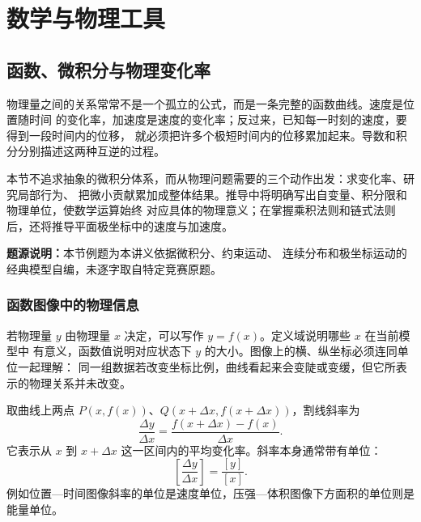 \documentclass[UTF8,zihao=-4,oneside,openany]{ctexbook}
\numberwithin{equation}{section}
\begin{document}
\setcounter{page}{1}
\setcounter{chapter}{0}
\chapter{数学与物理工具}
\setcounter{section}{2}
\fi
\ifdefined\MASTERBOOK\clearpage\fi
\section{函数、微积分与物理变化率}

物理量之间的关系常常不是一个孤立的公式，而是一条完整的函数曲线。速度是位置随时间
的变化率，加速度是速度的变化率；反过来，已知每一时刻的速度，要得到一段时间内的位移，
就必须把许多个极短时间内的位移累加起来。导数和积分分别描述这两种互逆的过程。

本节不追求抽象的微积分体系，而从物理问题需要的三个动作出发：求变化率、研究局部行为、
把微小贡献累加成整体结果。推导中将明确写出自变量、积分限和物理单位，使数学运算始终
对应具体的物理意义；在掌握乘积法则和链式法则后，还将推导平面极坐标中的速度与加速度。

{\small\color{TextGray}\noindent\textbf{题源说明：}本节例题为本讲义依据微积分、约束运动、
连续分布和极坐标运动的经典模型自编，未逐字取自特定竞赛原题。\par}

\subsection{函数图像中的物理信息}

若物理量 $y$ 由物理量 $x$ 决定，可以写作 $y=f(x)$。定义域说明哪些 $x$ 在当前模型中
有意义，函数值说明对应状态下 $y$ 的大小。图像上的横、纵坐标必须连同单位一起理解：
同一组数据若改变坐标比例，曲线看起来会变陡或变缓，但它所表示的物理关系并未改变。

取曲线上两点 $P(x,f(x))$、$Q(x+\Delta x,f(x+\Delta x))$，割线斜率为
\begin{equation}
  \frac{\Delta y}{\Delta x}
  =\frac{f(x+\Delta x)-f(x)}{\Delta x}.
  \label{eq:average-rate}
\end{equation}
它表示从 $x$ 到 $x+\Delta x$ 这一区间内的平均变化率。斜率本身通常带有单位：
\[
  \left[\frac{\Delta y}{\Delta x}\right]=\frac{[y]}{[x]}.
\]
例如位置—时间图像斜率的单位是速度单位，压强—体积图像下方面积的单位则是能量单位。
\end{document}
